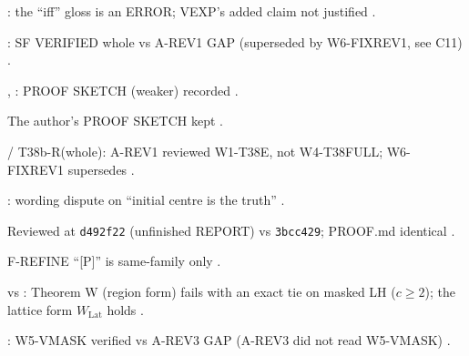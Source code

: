 \begin{uncertain}
: the ``iff'' gloss is an ERROR; VEXP's added claim not justified .
\end{uncertain}
\begin{uncertain}[C8 · T38b-R (whole)]
: SF VERIFIED whole vs A-REV1 GAP (superseded by W6-FIXREV1, see C11) .
\end{uncertain}
\begin{uncertain}
, : PROOF SKETCH (weaker) recorded .
\end{uncertain}
\begin{uncertain}
The author's PROOF SKETCH kept .
\end{uncertain}
\begin{uncertain}[C11 · T38-(0) scope]
 / T38b-R(whole): A-REV1 reviewed W1-T38E, not W4-T38FULL; W6-FIXREV1 supersedes .
\end{uncertain}
\begin{uncertain}
: wording dispute on ``initial centre is the truth'' .
\end{uncertain}
\begin{uncertain}
Reviewed at \texttt{d492f22} (unfinished REPORT) vs \texttt{3bcc429}; PROOF.md identical .
\end{uncertain}
\begin{uncertain}
F-REFINE ``[P]'' is same-family only .
\end{uncertain}
\begin{uncertain}
 vs : Theorem W (region form) fails with an exact tie on masked LH ($c\ge2$); the lattice form $W_{\mathrm{Lat}}$ holds .
\end{uncertain}
\begin{uncertain}[C16 · PXN-P6]
: W5-VMASK verified vs A-REV3 GAP (A-REV3 did not read W5-VMASK) .
\end{uncertain}

